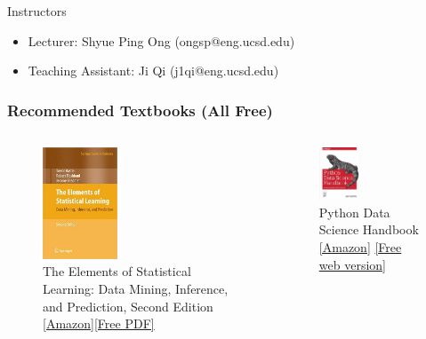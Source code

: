 \documentclass[aspectratio=169]{beamer}
\begin{document}
\begin{frame}{Instructors}
    \begin{itemize}
        \item Lecturer: Shyue Ping Ong (ongsp@eng.ucsd.edu)
        \item Teaching Assistant: Ji Qi (j1qi@eng.ucsd.edu)
    \end{itemize}
\end{frame}


\begin{frame}
\frametitle{Recommended Textbooks (All Free)}

\begin{columns}
\begin{figure}
    \centering
    \includegraphics[width=0.4\textwidth]{figures/book-cover-elements-of-statistical-learning.jpg}
    \caption{The Elements of Statistical Learning: Data Mining, Inference, and Prediction, Second Edition  \href{http://www.amazon.com/dp/0387848576/ref=cm_sw_em_r_mt_dp_U_LTvbEbPHKK8VF}{[Amazon]}\href{http://web.stanford.edu/~hastie/ElemStatLearn/}{[Free PDF]}}
\end{figure}
\begin{figure}
    \centering
    \includegraphics[width=0.4\textwidth]{figures/book-cover-python-data-science.jpg}
    \caption{Python Data Science Handbook
        \href{https://www.amazon.com/dp/1491912057/ref=cm_sw_em_r_mt_dp_U_g0vbEb9N7HVQD}{[Amazon]} \href{http://jakevdp.github.io/PythonDataScienceHandbook/}{[Free web version]}}
\end{figure}
\end{columns}
\end{frame}
\end{document}
